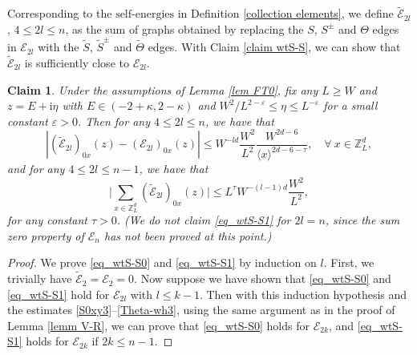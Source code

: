 \documentclass{article}
\newcommand{\1}{\mathds{1}}
\numberwithin{equation}{section}
\newcommand{\be}{\begin{equation}}
\newcommand{\ee}{\end{equation}}
\newcommand{\e}{{\varepsilon}}
\newcommand{\wt}{\widetilde}
\newcommand{\ii}{\mathrm{i}} %
\renewcommand{\leq}{\leqslant}
\renewcommand{\geq}{\geqslant}
\renewcommand{\le}{\leq}
\renewcommand{\ge}{\geq}
\newcommand{\Z}{\mathbb{Z}}
\newcommand{\selfs}{\text{self-energies}}
\theoremstyle{plain} %
\newtheorem{claim}[theorem]{Claim}
\theoremstyle{remark}
\newcommand{\Sele}{{\mathcal E}}
\newcommand{\Selek}{{\mathcal E}}
\begin{document}
Corresponding to the $\selfs$ in Definition \ref{collection elements}, we define $\wt\Sele_{2l}$, $4\le 2l\le n$, as the sum of graphs obtained by replacing the $ S$, $ S^\pm$ and $ \Theta$ edges in $\Sele_{2l}$ with the $\wt S$, $\wt S^\pm$ and $\wt\Theta$ edges. With Claim \ref{claim wtS-S}, we can show that $\wt\Sele_{2l}$ is sufficiently close to $\Sele_{2l}$. %
\begin{claim}\label{claim_wtself}
Under the assumptions of Lemma \ref{lem FT0}, fix any $L\ge W$ and $z=E+\ii \eta$ with $E\in (-2+\kappa,2-\kappa)$ and $W^{2}/L^{2-\e}\le \eta\le L^{-\e}$ for a small constant $\e>0$. Then for any $4\le 2l \le n$, we have that
\be\label{eq_wtS-S0}
\left| (\wt \Selek_{2l})_{0x}(z)-(\Sele_{2l})_{0x}(z) \right| \le W^{-ld} \frac{W^2}{L^2} \frac{W^{2d-6}}{\langle x\rangle^{2d-6-\tau}}, \quad \forall \  x\in \Z_L^d  ,
\ee
and for any $4\le 2l \le n-1$, we have that
\be\label{eq_wtS-S1}
\Big|\sum_{x\in \Z_L^d} (\wt\Selek_{2l})_{0x}(z)\Big|   \le  L^\tau W^{-(l-1)d} \frac{W^2}{L^2} ,
\ee
for any constant $\tau>0$. (We do not claim \eqref{eq_wtS-S1} for $2l=n$, since the sum zero property of $\Sele_n$ has not been proved at this point.)
\end{claim} 
\begin{proof}
	We prove \eqref{eq_wtS-S0} and \eqref{eq_wtS-S1} by induction on $l$. First, we trivially have $\wt\Sele_2=\Sele_2=0$. Now suppose we have shown that \eqref{eq_wtS-S0} and \eqref{eq_wtS-S1} hold for $\Sele_{2l}$ with $l\le k-1$. Then with this induction hypothesis and the estimates \eqref{S0xy3}--\eqref{Theta-wh3}, using the same argument as in the proof of Lemma \ref{lemm V-R},  we can prove that \eqref{eq_wtS-S0} holds for $\Sele_{2k}$, and \eqref{eq_wtS-S1} holds for $\Sele_{2k}$ if $2k\le n-1$.
\end{proof}
\end{document}
